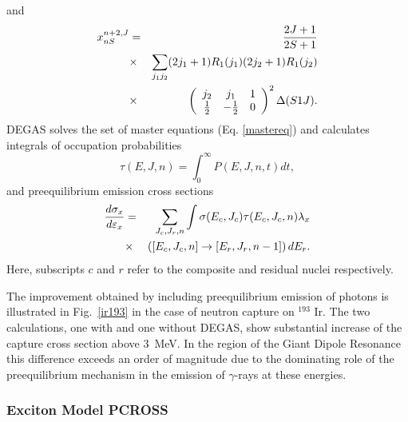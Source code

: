 and
\begin{eqnarray}
x_{nS}^{n+2,J}&=&\frac{2J+1}{2S+1}  \notag \\
&\times&\sum_{j_{1}j_{2}}(2j_{1}+1)R_{1}(j_{1})(2j_{2}+1)R_{1}(j_{2})  \notag
\\
&\times&\left(%
\begin{array}{ccc}
j_{2} & j_{1} & 1 \\
\frac{1}{2} & -\frac{1}{2} & 0%
\end{array}%
\right)^{2}\Delta(S1J).
\end{eqnarray}
DEGAS%
 solves the set of master equations (Eq. \ref{mastereq}) and
calculates integrals of occupation probabilities
\begin{equation}
\tau(E,J,n)=\int_{0}^{\infty}P(E,J,n,t)dt,
\end{equation}
and preequilibrium emission cross sections
\begin{eqnarray}
\frac{d\sigma_{x}}{d\varepsilon_{x}}&=&\sum_{J_{c},J_{r},n}\int%
\sigma(E_{c},J_{c})\tau(E_{c},J_{c},n)\lambda_{x}  \notag \\
&\times&\left(\left[E_{c},J_{c},n\right]\rightarrow\left[E_{r},J_{r},n-1%
\right]\right)dE_{r}.
\end{eqnarray}
Here, subscripts $c$ and $r$ refer to the composite and residual nuclei
respectively.

The improvement obtained by including preequilibrium emission of photons is
illustrated in Fig.~\ref{ir193} in the case of neutron capture on $^{193}$%
Ir. The two calculations, one with and one without DEGAS, show substantial
increase of the capture cross section above 3~MeV. In the region of the
Giant Dipole Resonance this difference exceeds an order of magnitude due to
the dominating role of the preequilibrium mechanism in the emission of $%
\gamma$-rays at these energies.

\subsubsection{Exciton Model PCROSS\label{PCROSS}}

